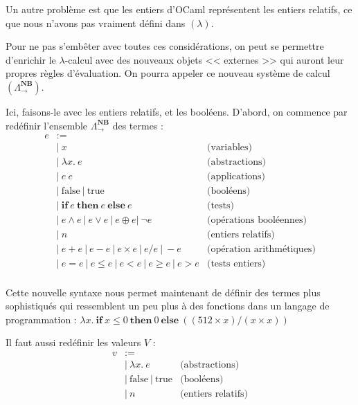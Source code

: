 \documentclass[11pt]{article}
\begin{document}
Un autre problème est que les entiers d'OCaml représentent les entiers relatifs, ce que nous n'avons pas vraiment défini dans $(\lambda)$.

Pour ne pas s'embêter avec toutes ces considérations, on peut se permettre d'enrichir le $\lambda$-calcul avec des nouveaux objets << externes >> qui auront leur propres règles d'évaluation. On pourra appeler ce nouveau système de calcul $\left(\Lambda_\rightarrow^{\textbf{NB}}\right)$.

Ici, faisons-le avec les entiers relatifs, et les booléens. D'abord, on commence par redéfinir l'ensemble $\Lambda_\rightarrow^{\textbf{NB}}$ des termes :
\begin{equation*}
\begin{aligned}
    e &:=\\
    &|~x&\text{(variables)}\\
    &|~\lambda x.~e&\text{(abstractions)}\\
    &|~e~e&\text{(applications)}\\
    &|~\text{false}~|~\text{true}&\text{(booléens)}\\
    &|~\textbf{if}~e~\textbf{then}~e~\textbf{else}~e&\text{(tests)}\\
    &|~e\wedge e~|~e\vee e~|~e\oplus e|~\neg e&\text{(opérations booléennes)}\\
    &|~n&\text{(entiers relatifs)}\\
    &|~e+e~|~e-e~|~e\times e~|~e/e~|~-e&\text{(opération arithmétiques)}\\
    &|~e=e~|~e\le e~|~e<e~|~e\ge e~|~e > e&\text{(tests entiers)}\\
\end{aligned}
\end{equation*}

Cette nouvelle syntaxe nous permet maintenant de définir des termes plus sophistiqués qui ressemblent un peu plus à des fonctions dans un langage de programmation : $\lambda x.~\textbf{if}~x \le 0~\textbf{then}~0~\textbf{else}~((512 \times x) / (x \times x))$

Il faut aussi redéfinir les valeurs $V$ :
\begin{equation*}
\begin{aligned}
    v &:=\\
    &|~\lambda x.~e&\text{(abstractions)}\\
    &|~\text{false}~|~\text{true}&\text{(booléens)}\\
    &|~n&\text{(entiers relatifs)}\\
\end{aligned}
\end{equation*}
\end{document}
